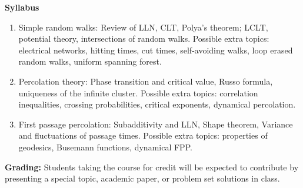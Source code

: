\documentclass[12pt]{article}
\begin{document}
\noindent \textbf{Syllabus}
\begin{enumerate} \item Simple random walks: Review of LLN, CLT, Polya's theorem; LCLT, potential theory, intersections of random walks. Possible extra topics: electrical networks, hitting times, cut times, self-avoiding walks, loop erased random walks, uniform spanning forest. 
	
\item Percolation theory: Phase transition and critical value, Russo formula, uniqueness of the infinite cluster. Possible extra topics: correlation inequalities, crossing probabilities, critical exponents, dynamical percolation. 

\item First passage percolation: Subadditivity and LLN, Shape theorem, Variance and fluctuations of passage times. Possible extra topics: properties of geodesics, Busemann functions, dynamical FPP. 

\end{enumerate}

\noindent \textbf{Grading:} Students taking the course for credit will be expected to contribute by presenting a special topic, academic paper, or problem set solutions in class. 
\end{document}
